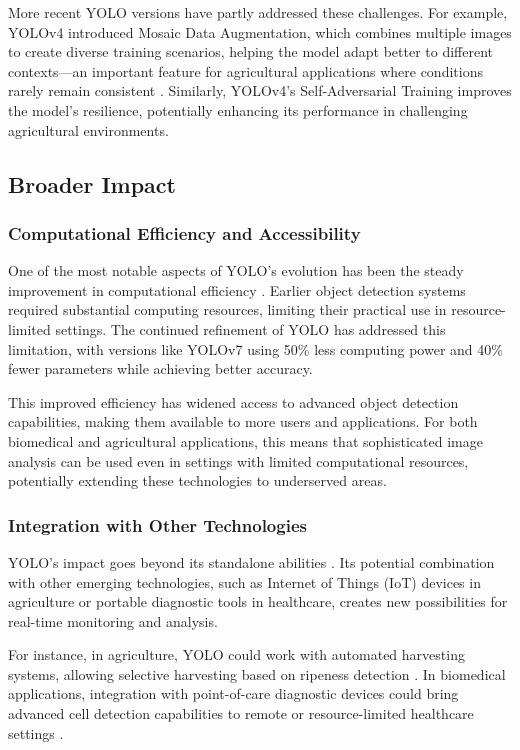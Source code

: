 \begin{multicols}{2}
	More recent YOLO versions have partly addressed these challenges. For example, YOLOv4 introduced Mosaic Data Augmentation, which combines multiple images to create diverse training scenarios, helping the model adapt better to different contexts—an important feature for agricultural applications where conditions rarely remain consistent \citep{bochkovskiy2020yolov4}. Similarly, YOLOv4's Self-Adversarial Training improves the model's resilience, potentially enhancing its performance in challenging agricultural environments.

	\subsection{Broader Impact}
	\subsubsection{Computational Efficiency and Accessibility}
	One of the most notable aspects of YOLO's evolution has been the steady improvement in computational efficiency \citep{Ultralytics2024}. Earlier object detection systems required substantial computing resources, limiting their practical use in resource-limited settings. The continued refinement of YOLO has addressed this limitation, with versions like YOLOv7 using 50\% less computing power and 40\% fewer parameters while achieving better accuracy.

	This improved efficiency has widened access to advanced object detection capabilities, making them available to more users and applications. For both biomedical and agricultural applications, this means that sophisticated image analysis can be used even in settings with limited computational resources, potentially extending these technologies to underserved areas.

	\subsubsection{Integration with Other Technologies}
	YOLO's impact goes beyond its standalone abilities \citep{8627998}. Its potential combination with other emerging technologies, such as Internet of Things (IoT) devices in agriculture or portable diagnostic tools in healthcare, creates new possibilities for real-time monitoring and analysis.

	For instance, in agriculture, YOLO could work with automated harvesting systems, allowing selective harvesting based on ripeness detection \citep{Koirala2019}. In biomedical applications, integration with point-of-care diagnostic devices could bring advanced cell detection capabilities to remote or resource-limited healthcare settings \citep{ChanCell2020}.
\end{multicols}
